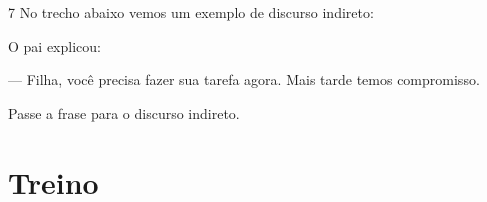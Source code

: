

\num{7} No trecho abaixo vemos um exemplo de discurso indireto:

\begin{myquote}

O pai explicou: 

--- Filha, você precisa fazer sua tarefa agora. Mais tarde
temos compromisso.

\end{myquote}

Passe a frase para o discurso indireto.


\section*{Treino}

